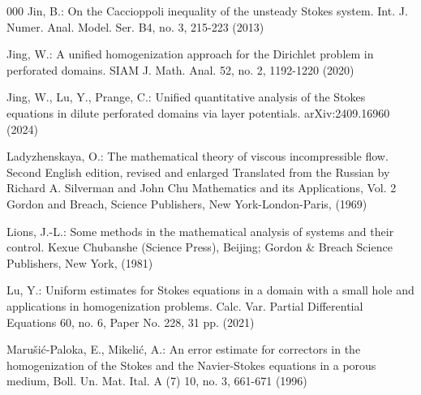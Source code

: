 \documentclass[13pt,CJK]{article}
\theoremstyle{plain}                       %
\theoremstyle{remark}
\numberwithin{equation}{section}
\begin{document}
\begin{thebibliography}{000}
Jin, B.: On the Caccioppoli inequality of the unsteady Stokes system.
Int. J. Numer. Anal. Model. Ser. B4, no. 3, 215-223
(2013)

Jing, W.:
A unified homogenization approach for the Dirichlet problem in perforated domains. SIAM J. Math. Anal. 52, no. 2, 1192-1220 (2020)


Jing, W., Lu, Y., Prange, C.:
Unified quantitative analysis of the Stokes equations in dilute perforated domains via layer potentials. arXiv:2409.16960 (2024)


%

Ladyzhenskaya, O.:
The mathematical theory of viscous incompressible flow. Second English edition, revised and enlarged Translated from the Russian by Richard A. Silverman and John Chu Mathematics
and its Applications, Vol. 2 Gordon and Breach, Science Publishers, New York-London-Paris, (1969)


Lions, J.-L.:
Some methods in the mathematical analysis of systems and their control. Kexue Chubanshe (Science Press),
Beijing; Gordon $\&$ Breach Science Publishers, New York,
(1981)


Lu, Y.:
Uniform estimates for Stokes equations in a domain with a small hole and applications in homogenization problems. Calc. Var. Partial Differential Equations 60, no. 6, Paper No. 228, 31 pp. (2021)



Maru\v{s}i\'{c}-Paloka, E., Mikeli\'{c}, A.:
An error estimate for correctors in the homogenization
of the Stokes and the Navier-Stokes equations in a porous medium,
Boll. Un. Mat. Ital. A (7) 10, no. 3, 661-671
(1996)



\end{thebibliography}
\end{document}
